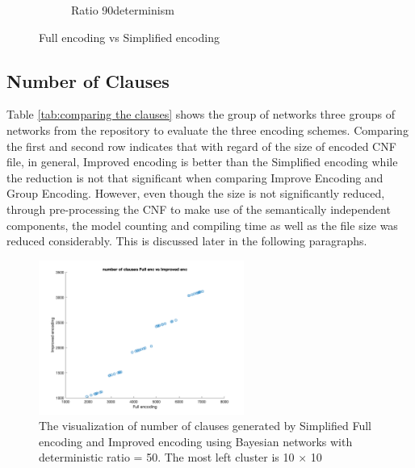 \begin{figure}[h]
\begin{subfigure}{0.32\textwidth}
\caption{Ratio 90determinism}
\label{fig: r90_determin}
\end{subfigure}
 
\caption{Full encoding vs Simplified encoding}
\label{fig:determinism}
\end{figure}

\subsection{Number of Clauses}
Table \ref{tab:comparing the clauses} shows the group of networks three groups of networks from the repository to evaluate the three encoding schemes. Comparing the first and second row indicates that with regard of the size of encoded CNF file, in general, Improved encoding is better than the Simplified encoding while the reduction is not that significant when comparing Improve Encoding and Group Encoding. However, even though the size is not significantly reduced, through pre-processing the CNF to make use of the semantically independent components, the model counting and compiling time as well as the file size was reduced considerably. This is discussed later in the following paragraphs.\\
\begin{figure}
    \centering
    \includegraphics[width = 0.6\textwidth]{pic/clauses_e1vs2.png}
    \caption{The visualization of number of clauses generated by Simplified Full encoding and Improved encoding using Bayesian networks with deterministic ratio = 50. The most left cluster is 10 $\times$ 10}
    \label{fig:clauses_compare_1v2_r50}
\end{figure}

